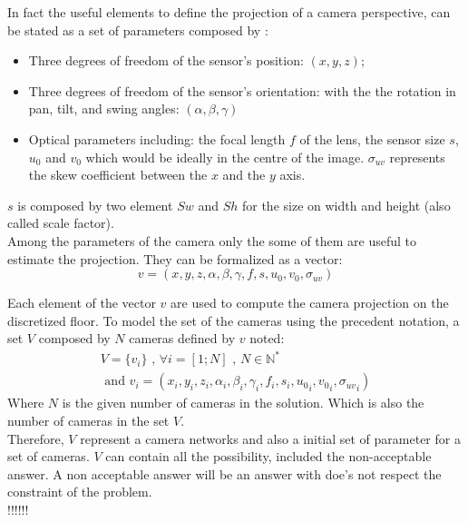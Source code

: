 In fact the useful elements to define the projection of a camera perspective, can be stated as a set of parameters composed by :\\
\begin{itemize}
\item Three degrees of freedom of the sensor’s position: $(x, y, z)$;
\item Three degrees of freedom of the sensor’s orientation: with the  the rotation in pan, tilt, and swing angles: $(\alpha,\beta, \gamma)$ 
\item Optical parameters including: the focal length $f$ of the lens, the sensor size $s$, $ u_{0}$ and $v_0 $  which would be ideally in the centre of the image. $\sigma_{uv}$ represents the skew coefficient between the $x$ and the $y$ axis.
\end{itemize}
$s$ is composed by two element $Sw$ and $Sh$ for the size on width and height (also called scale factor).\\

Among the parameters of the camera only the some of them are useful to estimate the projection. They can be formalized as a vector:
\begin{equation}\label{eq:v}
v=(x,y,z,\alpha ,\beta,\gamma,f,s,u_0,v_0,\sigma_{uv})
\end{equation}

Each element of the vector $v$ are used to compute the camera projection on the discretized floor. 
\iffalse 
To model the set of the cameras using the precedent notation, a set $V$ composed by $N$ cameras defined by $v$ noted:
\begin{equation}\label{eq:V}
\begin{split}
V= \{v_i\} \mbox{  , } \forall i=[1;N] \mbox{ , } N\in \mathbb{N}^*
\\
\mbox{ and } v_i= (x_i,y_i,z_i,\alpha_i ,\beta_i,\gamma_i,f_i,s_i,{u_0}_i,{v_0}_i,{\sigma_{uv}}_i)
\end{split}
\end{equation}
\noindent Where $N$ is the given number of cameras in the solution. Which is also the number of cameras in the set $V$. \\
Therefore, $V$ represent a camera networks and also a initial set of parameter for a set of cameras. $V$ can contain all the possibility, included the non-acceptable answer. A non acceptable  answer will be an answer with  doe's not respect the constraint of the problem.   
 \\ !!!!!!\\

